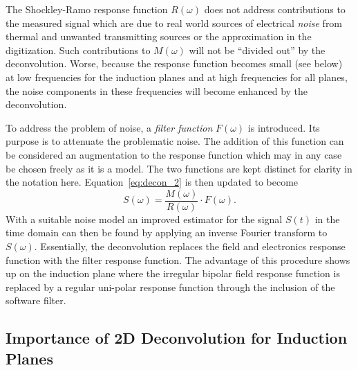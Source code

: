 The Shockley-Ramo response function $R(\omega)$ does not address
contributions to the measured signal which are due to real world
sources of electrical \textit{noise} from thermal and unwanted transmitting
sources or the approximation in the digitization.
Such contributions to $M(\omega)$ will not be ``divided out'' by the deconvolution.
Worse, because the response function becomes small (see below) at low 
frequencies for the induction planes and at high frequencies for all
planes, the noise components in these frequencies will become
enhanced by the deconvolution.

To address the problem of noise, a \textit{filter function} $F(\omega)$ is
introduced.  Its purpose is to attenuate the problematic noise.  The
addition of this function can be considered an augmentation to the
response function which may in any case be chosen freely as it is a model.  
The two functions are kept distinct for clarity in the notation here.
Equation~\ref{eq:decon_2} is then updated to become
\begin{equation}\label{eq:decon_filt}
S(\omega) = \frac{M(\omega)}{R(\omega)} \cdot F(\omega).
\end{equation}
With a suitable noise model an improved estimator for the signal
$S(t)$ in the time domain can then be found by applying an inverse Fourier 
transform to $S(\omega)$.  Essentially, the deconvolution replaces the field and 
electronics response function with the filter response function. The 
advantage of this procedure shows up on the induction plane where the irregular bipolar 
field response function is replaced by a regular uni-polar response function through
the inclusion of the software filter. 


\subsection{Importance of 2D Deconvolution for Induction Planes}

